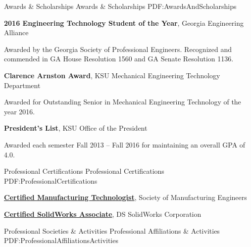 \documentclass[
letterpaper,
MMMyyyy,
nonstopmode,
draftmode,
]{resume}
\begin{document}
\begin{Body}

\Section
{Awards \&\newline
Scholarships}
{Awards \& Scholarships}
{PDF:AwardsAndScholarships}

\textbf{2016 Engineering Technology Student of the Year},
Georgia Engineering Alliance
\begin{Detail}
\SubBulletItem
Awarded by the Georgia Society of Professional Engineers.
\SubBulletItem
Recognized and commended in GA House Resolution 1560 and GA Senate Resolution 1136.
\end{Detail}

\Gap

\textbf{Clarence Arnston Award},
KSU Mechanical Engineering Technology Department
\begin{Detail}
\SubBulletItem
Awarded for Outstanding Senior in Mechanical Engineering Technology of the year 2016.
\end{Detail}

\Gap

\textbf{President's List},
KSU Office of the President
\begin{Detail}
\SubBulletItem
Awarded each semester Fall 2013 – Fall 2016 for maintaining an overall GPA of 4.0.
\end{Detail}



\Section
{Professional Certifications}
{Professional Certifications}
{PDF:ProfessionalCertifications}

\textbf{\href{http://www.sme.org/cmfgt/}
{Certified Manufacturing Technologist}},
Society of Manufacturing Engineers

\textbf{\href{http://www.solidworks.com/sw/support/mcad-certification-programs.htm}
{Certified SolidWorks Associate}},
DS SolidWorks Corporation



\Section
{Professional Societies\newline
\& Activities}
{Professional Affiliations \& Activities}
{PDF:ProfessionalAffiliationsActivities}


\end{Body}
\end{document}
